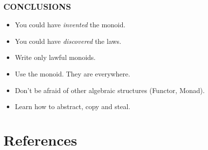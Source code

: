 \documentclass{beamer}
\begin{document}
\begin{frame} \frametitle{CONCLUSIONS}
  \begin{itemize}
    \item You could have \emph{invented} the monoid.
    \item You could have \emph{discovered} the laws.
    \item Write only \alert{lawful} monoids.
    \item \alert{Use the monoid}. They are everywhere.
    \item Don't be afraid of other algebraic structures (Functor, Monad).
    \item \alert{Learn how to abstract}, copy and steal.
  \end{itemize}
\end{frame}

\section*{References}
\end{document}
